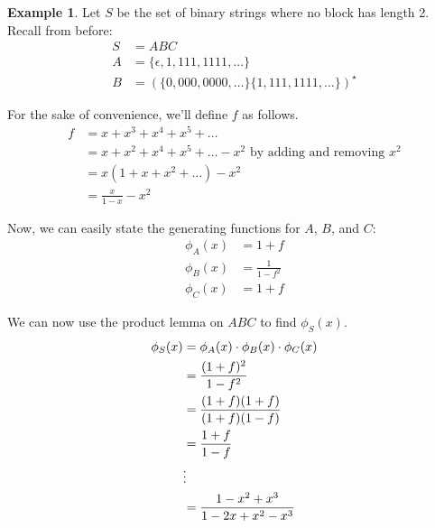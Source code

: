 \documentclass[]{article}
\theoremstyle{definition}
\newtheorem{ex}{Example}[section]
\begin{document}
			\begin{ex}
				Let $S$ be the set of binary strings where no block has length 2. Recall from before:
				\begin{align*}
					S &= ABC \\
					A &= \{\epsilon, 1, 111, 1111, \ldots\} \\
					B &= (\{0, 000, 0000, \ldots\}\{1, 111, 1111, \ldots\})^\star
				\end{align*}

				For the sake of convenience, we'll define $f$ as follows.
				\begin{align*}
					f &= x + x^3 + x^4 + x^5 + \ldots \\
					&= x + x^2 + x^4 + x^5 + \ldots - x^2 \text{ by adding and removing } x^2 \\
					&= x(1 + x + x^2 + \ldots) - x^2 \\
					&= \frac{x}{1 - x} - x^2
				\end{align*}

				Now, we can easily state the generating functions for $A$, $B$, and $C$:
				\begin{align*}
					\phi_A(x) &= 1 + f \\
					\phi_B(x) &= \frac{1}{1 - f^2} \\
					\phi_C(x) &= 1 + f
				\end{align*}

				We can now use the product lemma on $ABC$ to find $\phi_S(x)$.
				\begin{align*}
					\phi_S(x) &= \phi_A(x) \cdot \phi_B(x) \cdot \phi_C(x) \\
					&= \frac{(1 + f)^2}{1 - f^2} \\
					&= \frac{(1 + f)(1 + f)}{(1 + f)(1 - f)} \\
					&= \frac{1 + f}{1 - f} \\
					& \text{\vdots} \\ 
					&= \frac{1 - x^2 + x^3}{1 - 2x + x^2 - x^3}
				\end{align*}
			\end{ex}
\end{document}

